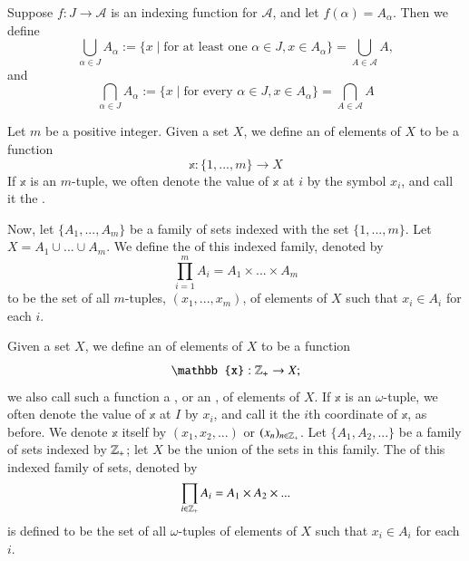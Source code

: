\documentclass[12pt, a4paper, oneside, openright, titlepage]{book}
\begin{document}
\begin{appendices}
    \begin{definition}
        Suppose $f:J\rightarrow \mathscr{A}$ is an indexing function for $\mathscr{A}$, and let $f(\alpha) = A_{\alpha}$. Then we define \begin{equation*}
            \bigcup\limits_{\alpha \in J}A_{\alpha}:=\{x\;\vert\;\text{for at least one $\alpha \in J, x \in A_{\alpha}$}\} = \bigcup\limits_{A\in \mathscr{A}}A,
        \end{equation*}
        and \begin{equation*}
            \bigcap\limits_{\alpha \in J}A_{\alpha} :=\{x\;\vert\;\text{for every $\alpha \in J, x \in A_{\alpha}$}\} = \bigcap\limits_{A\in\mathscr{A}}A
        \end{equation*}
    \end{definition}


    \begin{definition}
        Let $m$ be a positive integer. Given a set $X$, we define an  of elements of $X$ to be a function \begin{equation*}
            \mathbb{x}:\{1,...,m\}\rightarrow X
        \end{equation*}
        If $\mathbb{x}$ is an $m$-tuple, we often denote the value of $\mathbb{x}$ at $i$ by the symbol $x_i$, and call it the .

        Now, let $\{A_1,...,A_m\}$ be a family of sets indexed with the set $\{1,...,m\}$. Let $X = A_1\cup ... \cup A_m$. We define the  of this indexed family, denoted by \begin{equation*}
            \prod\limits_{i=1}^mA_i = A_1\times ... \times A_m
        \end{equation*}
        to be the set of all $m$-tuples, $(x_1,...,x_m)$, of elements of $X$ such that $x_i \in A_i$ for each $i$.
    \end{definition}

    \begin{definition}
        Given a set $X$, we define an  of elements of $X$ to be a function \begin{equation*}
            \mathbb{x}:\Z_+\rightarrow X;
        \end{equation*}
        we also call such a function a , or an , of elements of $X$. If $\mathbb{x}$ is an $\omega$-tuple, we often denote the value of $\mathbb{x}$ at $I$ by $x_i$, and call it the $i$th coordinate of $\mathbb{x}$, as before. We denote $\mathbb{x}$ itself by $(x_1,x_2,...)$ or $(x_n)_{n\in\mathbb Z_+}$. Let $\{A_1,A_2,...\}$ be a family of sets indexed by $\mathbb Z_+$; let $X$ be the union of the sets in this family. The  of this indexed family of sets, denoted by \begin{equation*}
            \prod\limits_{i\in\mathbb Z_+}A_i = A_1\times A_2 \times ...
        \end{equation*}
        is defined to be the set of all $\omega$-tuples of elements of $X$ such that $x_i \in A_i$ for each $i$.
    \end{definition}


\end{appendices}
\end{document}
